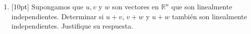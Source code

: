 \documentclass[11pt]{article}
\begin{document}
\begin{enumerate}
\vspace{6cm}

\item{}[10pt] Supongamos que $u, v$ y $w$ son vectores en $\mathbb{R}^n$ que son linealmente independientes. Determinar si $u+v$, $v+w$ y $u+w$ también son linealmente independientes. Justifique su respuesta.

\vspace{2cm}
\end{enumerate}

\examfooter
\end{document}
